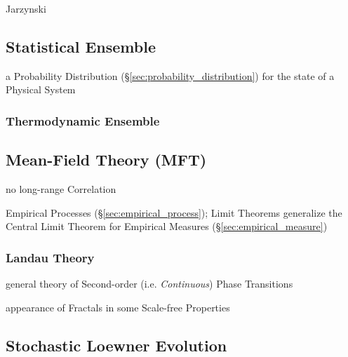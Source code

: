 Jarzynski



\subsection{Statistical Ensemble}\label{sec:statistical_ensemble}

a Probability Distribution (\S\ref{sec:probability_distribution}) for the state
of a Physical System



\subsubsection{Thermodynamic Ensemble}\label{sec:thermodynamic_ensemble}



\subsection{Mean-Field Theory (MFT)}\label{sec:mft}

no long-range Correlation

\fist Empirical Processes (\S\ref{sec:empirical_process}); Limit Theorems
generalize the Central Limit Theorem for Empirical Measures
(\S\ref{sec:empirical_measure})



\subsubsection{Landau Theory}\label{sec:landau_theory}

general theory of Second-order (i.e. \emph{Continuous}) Phase Transitions

appearance of Fractals in some Scale-free Properties



\subsection{Stochastic Loewner Evolution}\label{sec:stochastic_loewner}

